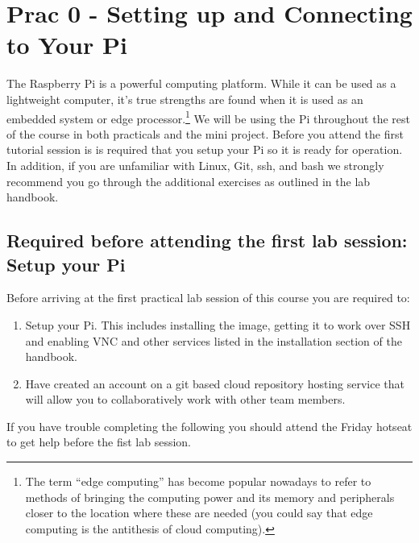 \setcounter{section}{-1}
\section{Prac 0 - Setting up and Connecting to Your Pi}
The Raspberry Pi is a powerful computing platform. While it can be used as a lightweight computer, it's true strengths are found when it is used as an embedded system or edge processor.\footnote{The term “edge computing” has become popular nowadays to refer to methods of bringing the computing power and its memory and peripherals closer to the location where these are needed (you could say that edge computing is the antithesis of cloud computing).}  We will be using the Pi throughout the rest of the course in both practicals and the mini project.  Before you attend the first tutorial session is is required that you setup your Pi so it is ready for operation.  In addition, if you are unfamiliar with Linux, Git, ssh, and bash we strongly recommend you go through the additional exercises as outlined in the lab handbook.

\subsection{Required before attending the first lab session: Setup your Pi }
Before arriving at the first practical lab session of this course you are required to:
\begin{enumerate}
    \item Setup your Pi. This includes installing the image, getting it to work over SSH and enabling VNC and other services listed in the installation section of the handbook.
    \item Have created an account on a git based cloud repository hosting service that will allow you to collaboratively work with other team members.
\end{enumerate}

If you have trouble completing the following you should attend the Friday hotseat to get help before the fist lab session.

